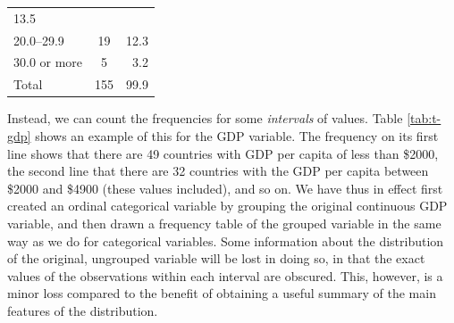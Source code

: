 \documentclass[11pt,a4paper,openany]{book}
\begin{document}
\begin{longtable}[]{@{}lcr@{}}
\begin{minipage}[t]{0.08\columnwidth}
13.5\strut
\end{minipage}\tabularnewline
\begin{minipage}[t]{0.20\columnwidth}\raggedright\strut
20.0--29.9\strut
\end{minipage} & \begin{minipage}[t]{0.15\columnwidth}\centering\strut
19\strut
\end{minipage} & \begin{minipage}[t]{0.08\columnwidth}\raggedleft\strut
12.3\strut
\end{minipage}\tabularnewline
\begin{minipage}[t]{0.20\columnwidth}\raggedright\strut
30.0 or more\strut
\end{minipage} & \begin{minipage}[t]{0.15\columnwidth}\centering\strut
5\strut
\end{minipage} & \begin{minipage}[t]{0.08\columnwidth}\raggedleft\strut
3.2\strut
\end{minipage}\tabularnewline
\begin{minipage}[t]{0.20\columnwidth}\raggedright\strut
Total\strut
\end{minipage} & \begin{minipage}[t]{0.15\columnwidth}\centering\strut
155\strut
\end{minipage} & \begin{minipage}[t]{0.08\columnwidth}\raggedleft\strut
99.9\strut
\end{minipage}\tabularnewline
\bottomrule
\end{longtable}

Instead, we can count the frequencies for some \emph{intervals} of
values. Table \ref{tab:t-gdp} shows an example of this for the GDP
variable. The frequency on its first line shows that there are 49
countries with GDP per capita of less than \$2000, the second line that
there are 32 countries with the GDP per capita between \$2000 and \$4900
(these values included), and so on. We have thus in effect first created
an ordinal categorical variable by grouping the original continuous GDP
variable, and then drawn a frequency table of the grouped variable in
the same way as we do for categorical variables. Some information about
the distribution of the original, ungrouped variable will be lost in
doing so, in that the exact values of the observations within each
interval are obscured. This, however, is a minor loss compared to the
benefit of obtaining a useful summary of the main features of the
distribution.
\end{document}
